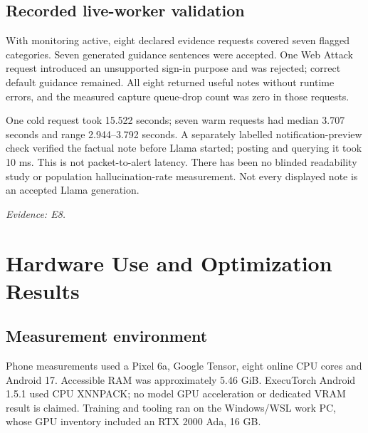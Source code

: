 \documentclass[11pt,a4paper]{article}
\newcommand{\source}[1]{{\small\textit{Evidence: #1.}\par}}
\newcommand{\chapterpage}[1]{\clearpage\section{#1}}
\begin{document}
\subsection*{Recorded live-worker validation}
With monitoring active, eight declared evidence requests covered seven flagged
categories. Seven generated guidance sentences were accepted. One Web Attack request
introduced an unsupported sign-in purpose and was rejected; correct default guidance
remained. All eight returned useful notes without runtime errors, and the measured
capture queue-drop count was zero in those requests.

One cold request took 15.522 seconds; seven warm requests had median 3.707 seconds
and range 2.944--3.792 seconds. A separately labelled notification-preview check verified
the factual note before Llama started; posting and querying it took 10 ms. This is not
packet-to-alert latency. There has been no blinded readability study or population
hallucination-rate measurement. Not every displayed note is an accepted Llama generation.
\source{E8}

\chapterpage{Hardware Use and Optimization Results}
\subsection*{Measurement environment}
Phone measurements used a Pixel 6a, Google Tensor, eight online CPU cores and Android 17.
Accessible RAM was approximately 5.46 GiB. ExecuTorch Android 1.5.1 used CPU XNNPACK;
no model GPU acceleration or dedicated VRAM result is claimed. Training and tooling
ran on the Windows/WSL work PC, whose GPU inventory included an RTX 2000 Ada, 16 GB.
\end{document}
